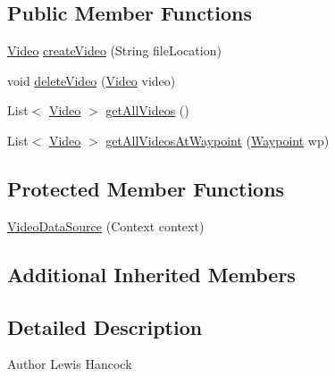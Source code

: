 \subsection*{Public Member Functions}
\begin{DoxyCompactItemize}
\item 
\hyperlink{classuk_1_1ac_1_1swan_1_1digitaltrails_1_1components_1_1_video}{Video} \hyperlink{classuk_1_1ac_1_1swan_1_1digitaltrails_1_1database_1_1_video_data_source_ab76fb5bc9b8077fc94c252c6b32ba9ac}{create\+Video} (String file\+Location)
\item 
void \hyperlink{classuk_1_1ac_1_1swan_1_1digitaltrails_1_1database_1_1_video_data_source_adc434438cecf561102ababc4a4363d36}{delete\+Video} (\hyperlink{classuk_1_1ac_1_1swan_1_1digitaltrails_1_1components_1_1_video}{Video} video)
\item 
List$<$ \hyperlink{classuk_1_1ac_1_1swan_1_1digitaltrails_1_1components_1_1_video}{Video} $>$ \hyperlink{classuk_1_1ac_1_1swan_1_1digitaltrails_1_1database_1_1_video_data_source_a15bdc4035ed5280356768684b064a1f8}{get\+All\+Videos} ()
\item 
List$<$ \hyperlink{classuk_1_1ac_1_1swan_1_1digitaltrails_1_1components_1_1_video}{Video} $>$ \hyperlink{classuk_1_1ac_1_1swan_1_1digitaltrails_1_1database_1_1_video_data_source_af47b90bb88ad3b66bcb099a74ac6c973}{get\+All\+Videos\+At\+Waypoint} (\hyperlink{classuk_1_1ac_1_1swan_1_1digitaltrails_1_1components_1_1_waypoint}{Waypoint} wp)
\end{DoxyCompactItemize}
\subsection*{Protected Member Functions}
\begin{DoxyCompactItemize}
\item 
\hyperlink{classuk_1_1ac_1_1swan_1_1digitaltrails_1_1database_1_1_video_data_source_a29a99c61373776523ab47f3daf59bc33}{Video\+Data\+Source} (Context context)
\end{DoxyCompactItemize}
\subsection*{Additional Inherited Members}


\subsection{Detailed Description}
\begin{DoxyAuthor}{Author}
Lewis Hancock 
\end{DoxyAuthor}


